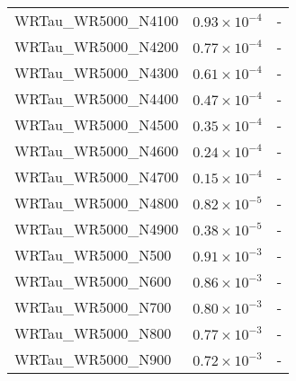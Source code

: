 \begin{longtable}[c]{| C{.35\textwidth} | C{.15\textwidth} | C{.1\textwidth}|}
    WRTau\_WR5000\_N4100 & $0.93\times10^{-4}$ & - \\
    WRTau\_WR5000\_N4200 & $0.77\times10^{-4}$ & - \\
    WRTau\_WR5000\_N4300 & $0.61\times10^{-4}$ & - \\
    WRTau\_WR5000\_N4400 & $0.47\times10^{-4}$ & - \\
    WRTau\_WR5000\_N4500 & $0.35\times10^{-4}$ & - \\
    WRTau\_WR5000\_N4600 & $0.24\times10^{-4}$ & - \\
    WRTau\_WR5000\_N4700 & $0.15\times10^{-4}$ & - \\
    WRTau\_WR5000\_N4800 & $0.82\times10^{-5}$ & - \\
    WRTau\_WR5000\_N4900 & $0.38\times10^{-5}$ & - \\
    WRTau\_WR5000\_N500 & $0.91\times10^{-3}$ & - \\
    WRTau\_WR5000\_N600 & $0.86\times10^{-3}$ & - \\
    WRTau\_WR5000\_N700 & $0.80\times10^{-3}$ & - \\
    WRTau\_WR5000\_N800 & $0.77\times10^{-3}$ & - \\
    WRTau\_WR5000\_N900 & $0.72\times10^{-3}$ & - \\ \hline

\end{longtable}
